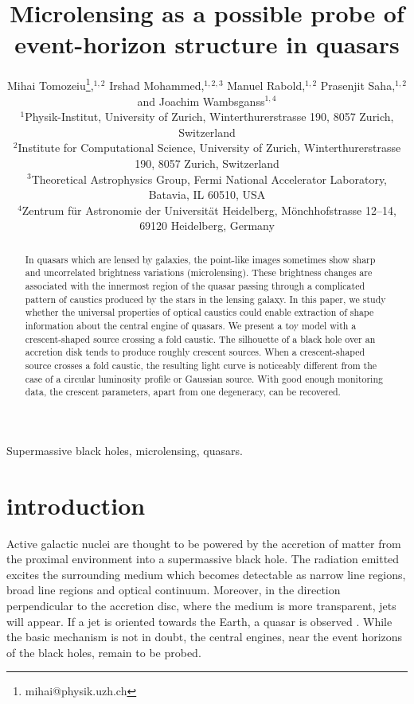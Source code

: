 \documentclass[usenatbib]{mn2e}
\title{Microlensing as a possible probe of event-horizon structure in quasars}
\author[Tomozeiu et al]{Mihai Tomozeiu\thanks{mihai@physik.uzh.ch},$^{1,2}$ 
Irshad Mohammed,$^{1,2,3}$ 
Manuel Rabold,$^{1,2}$
Prasenjit Saha,$^{1,2}$  
\newauthor
and Joachim Wambsganss$^{1,4}$\\
$^1${Physik-Institut, University of Zurich, Winterthurerstrasse 190,
  8057 Zurich, Switzerland} \\
$^2${Institute for Computational Science, University of Zurich,
  Winterthurerstrasse 190, 8057 Zurich, Switzerland} \\
$^3${Theoretical Astrophysics Group, Fermi National Accelerator Laboratory, Batavia, IL 60510, USA}\\
$^4${Zentrum f\"ur Astronomie der Universit\"at Heidelberg,
  M\"onchhofstrasse 12--14, 69120 Heidelberg, Germany}
}
\begin{document}
\maketitle

\begin{abstract}

In quasars which are lensed by galaxies, the point-like images sometimes show sharp and uncorrelated brightness 
variations (microlensing). These brightness changes are associated with the innermost region of the quasar passing 
through a complicated pattern of caustics produced by the stars in the lensing galaxy. In this paper, we study 
whether the universal properties of optical caustics could enable extraction of shape information about the central 
engine of quasars. We present a toy model with a crescent-shaped source crossing a fold caustic. The silhouette 
of a black hole over an accretion disk tends to produce roughly crescent sources. When a crescent-shaped source 
crosses a fold caustic, the resulting light curve is noticeably different from the case of a circular luminosity 
profile or Gaussian source. With good enough monitoring data, the crescent parameters, apart from one degeneracy, 
can be recovered.

\end{abstract}


\begin{keywords}
Supermassive black holes, microlensing, quasars.
\end{keywords}

\section{introduction}

Active galactic nuclei are thought to be powered by the
accretion of matter from the proximal environment into a supermassive
black hole.  The radiation emitted excites the surrounding medium
which becomes detectable as narrow line regions, broad line regions
and optical continuum.  Moreover, in the direction perpendicular to
the accretion disc, where the medium is more transparent, jets will
appear.  If a jet is oriented towards the Earth, a quasar is observed
\citep[e.g.,][]{1984RvMP...56..255B}.  While the basic mechanism
\citep[originating in the work
  of][]{1964ApJ...140..796S,1964SPhD....9..246Z,1969Natur.223..690L}
is not in doubt, the central engines, near the event horizons of the
black holes, remain to be probed.
\end{document}
